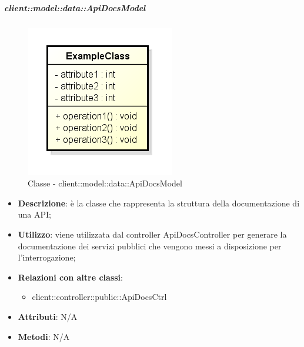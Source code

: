 		\subparagraph{client::model::data::ApiDocsModel} %
		\label{subp:client_model_data_apidocsmodel}
			\begin{figure}[htbp]
				\centering
				\centerline{\includegraphics[scale=0.7]{./images/client/classes/example_class.png}}
				\caption{Classe - client::model::data::ApiDocsModel}
			\end{figure}
			\begin{itemize}
				\item \textbf{Descrizione}: è la classe che rappresenta la struttura della documentazione di una API;
				\item \textbf{Utilizzo}: viene utilizzata dal controller ApiDocsController per generare la documentazione dei servizi pubblici che vengono messi a disposizione per l'interrogazione;
				\item \textbf{Relazioni con altre classi}:
					\begin{itemize}
						\item client::controller::public::ApiDocsCtrl
					\end{itemize}
				\item \textbf{Attributi}: N/A
				\item \textbf{Metodi}: N/A					
			\end{itemize}


